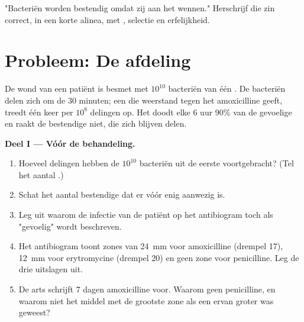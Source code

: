\begin{exercise}[$\star\star\star$]\label{exo:g11:antibiotic-resistance:15}
"Bacteriën worden bestendig omdat zij aan het  wennen."
Herschrijf die zin correct, in een korte alinea, met , selectie en
erfelijkheid.
\end{exercise}

\section{Probleem: De afdeling}

\begin{problem}
\label{pb:g11:antibiotic-resistance:1}
De wond van een patiënt is besmet met $10^{10}$ bacteriën van één .
De bacteriën delen zich om de 30 minuten; een  die weerstand tegen
het  amoxicilline geeft, treedt één keer per $10^8$ delingen
op. Het  doodt elke 6 uur 90\% van de gevoelige  en
raakt de bestendige  niet, die zich blijven delen.

\medskip
\noindent\textbf{Deel I --- Vóór de behandeling.}
\begin{enumerate}
  \item Hoeveel delingen hebben de $10^{10}$ bacteriën uit de eerste 
        voortgebracht? (Tel het aantal .)
  \item Schat het aantal bestendige  dat er vóór enig 
        aanwezig is.
  \item Leg uit waarom de infectie van de patiënt op het antibiogram toch
        als "gevoelig" wordt beschreven.
  \item Het antibiogram toont zones van \qty{24}{mm} voor amoxicilline
        (drempel 17), \qty{12}{mm} voor erytromycine (drempel 20) en geen
        zone voor penicilline. Leg de drie uitslagen uit.
  \item De arts schrijft 7 dagen amoxicilline voor. Waarom geen
        penicilline, en waarom niet het middel met de grootste zone als
        een ervan groter was geweest?
\end{enumerate}


\end{problem}
